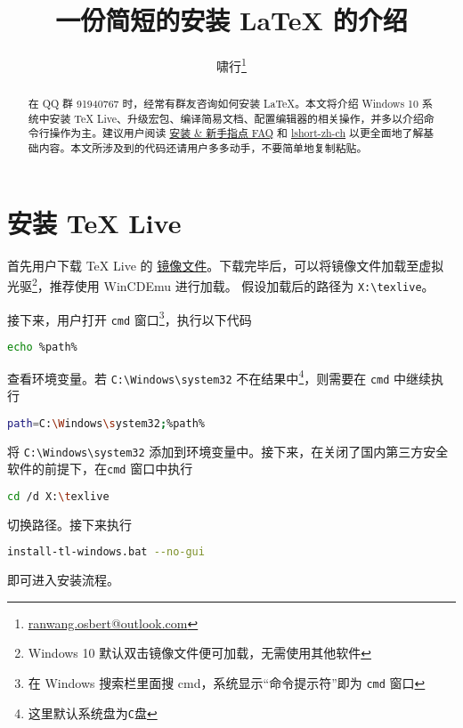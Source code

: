 \documentclass{ctexart}
\title{\bfseries 一份简短的安装 \LaTeX{} 的介绍}
\author{啸行\thanks{\url{ranwang.osbert@outlook.com}}}
\begin{document}
  
\maketitle

\begin{abstract}
在 QQ 群 91940767 时，经常有群友咨询如何安装 \LaTeX{}。本文将介绍 Windows 10 系统中安装 \TeX{} Live、升级宏包、编译简易文档、配置编辑器的相关操作，并多以介绍命令行操作为主。建议用户阅读 \href{http://www.latexstudio.net/archives/11469.html}{\LaTeXe{} 安装 \& 新手指点 FAQ} 和 \href{http://mirrors.ctan.org/info/lshort/chinese/lshort-zh-cn.pdf}{lshort-zh-ch} 以更全面地了解基础内容。本文所涉及到的代码还请用户多多动手，不要简单地复制粘贴。
\end{abstract}

\section{安装 \TeX{} Live}
首先用户下载 \TeX{} Live 的 \href{http://mirrors.ctan.org/systems/texlive/Images/texlive.iso}{镜像文件}。下载完毕后，可以将镜像文件加载至虚拟光驱\footnote{Windows 10 默认双击镜像文件便可加载，无需使用其他软件}，推荐使用 WinCDEmu 进行加载。
假设加载后的路径为 \texttt{X:\textbackslash texlive}。

接下来，用户打开 \texttt{cmd} 窗口\footnote{在 Windows 搜索栏里面搜 cmd，系统显示“命令提示符”即为 \texttt{cmd} 窗口}，执行以下代码
\begin{lstlisting}[language = bash]
  echo %path%
\end{lstlisting}
查看环境变量。若 \texttt{C:\textbackslash Windows\textbackslash system32} 不在结果中\footnote{这里默认系统盘为\texttt{C}盘}，则需要在 \texttt{cmd} 中继续执行
\begin{lstlisting}[language = bash]
  path=C:\Windows\system32;%path%
\end{lstlisting}
将 \verb|C:\Windows\system32| 添加到环境变量中。接下来，在关闭了国内第三方安全软件的前提下，在\texttt{cmd} 窗口中执行
\begin{lstlisting}[language = bash]
  cd /d X:\texlive
\end{lstlisting}
切换路径。接下来执行
\begin{lstlisting}[language = bash]
  install-tl-windows.bat --no-gui
\end{lstlisting}
即可进入安装流程。
\end{document}
